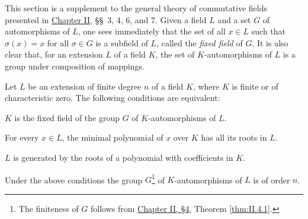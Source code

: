 \clearpage
{}%
\renewcommand{\chaptertitle}{GALOIS EXTENSIONS OF NUMBER FIELDS}


This section is a supplement to the general theory of commutative fields
presented in \hyperref[chap:II]{Chapter II}, \S\S~3, 4, 6, and 7. Given a field $L$ and a set
$G$ of automorphisms of $L$, one sees immediately that the set of all
$x\in L$ such that $\sigma(x)=x$ for all $\sigma\in G$ is a subfield of
$L$, called the \emph{fixed field} of $G$. It is also clear that, for an
extension $L$ of a field $K$, the set of $K$-automorphisms of $L$ is a
group under composition of mappings.

\begin{theorem}
\label{thm:VI.1.1}
Let $L$ be an extension of finite degree $n$ of a field $K$, where $K$ is
finite or of characteristic zero. The following conditions are equivalent:
\begin{alist}
\item $K$ is the fixed field of the group $G$ of $K$-automorphisms of $L$.
\item For every $x\in L$, the minimal polynomial of $x$ over $K$ has all
its roots in $L$.
\item $L$ is generated by the roots of a polynomial with coefficients in
$K$.
\end{alist}
Under the above conditions the group $G$\footnote{The finiteness of $G$ follows from \hyperref[sec:2.4]{Chapter II, §4}, Theorem
\ref{thm:II.4.1}.} of $K$-automorphisms of $L$ is of order $n$.
\end{theorem}

